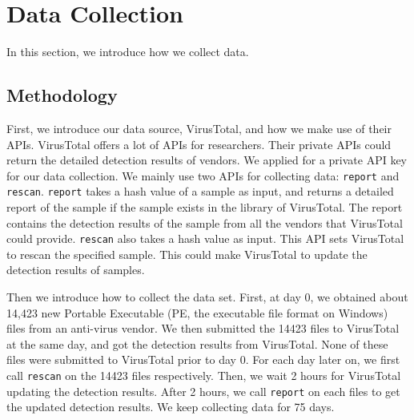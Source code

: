 \section{Data Collection}%












In this section, we introduce how we collect data. 

\subsection{Methodology}

First, we introduce our data source, VirusTotal, and how we make use of their APIs. VirusTotal offers a lot of APIs for researchers. Their private APIs could return the detailed detection results of vendors. We applied for a private API key for our data collection. We mainly use two APIs for collecting data: \texttt{report} and \texttt{rescan}. \texttt{report} takes a hash value of a sample as input, and returns a detailed report of the sample if the sample exists in the library of VirusTotal. The report contains the detection results of the sample from all the vendors that VirusTotal could provide. \texttt{rescan} also takes a hash value as input. This API sets VirusTotal to rescan the specified sample. This could make VirusTotal to update the detection results of samples.

Then we introduce how to collect the data set. 
First, at day 0, we obtained about 14,423 new Portable Executable (PE, the executable file format on Windows) files from an anti-virus vendor. 
We then submitted the 14423 files to VirusTotal at the same day, and got the detection results from VirusTotal. 
None of these files were submitted to VirusTotal prior to day 0.
For each day later on, we first call \texttt{rescan} on the 14423 files respectively. Then, we wait 2 hours for VirusTotal updating the detection results. 
After 2 hours, we call \texttt{report} on each files to get the updated detection results. 
We keep collecting data for 75 days. 


